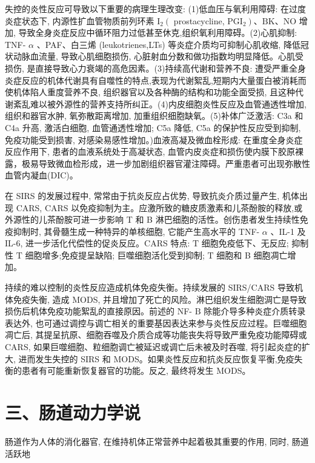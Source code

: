 \documentclass[10pt]{article}
\begin{document}
失控的炎性反应可导致以下重要的病理生理改变: (1)低血压与氧利用障碍: 在过度炎症状态下, 内源性扩血管物质前列环素 $\mathrm{I}_{2}\left(\right.$ prostacycline, $\left.\mathrm{PGI}_{2}\right) 、 \mathrm{BK} 、 \mathrm{NO}$ 增加, 导致全身炎症反应中循环阻力过低甚至休克,组织氧利用障碍。(2)心肌抑制: TNF- $\alpha$ 、PAF、白三烯 (leukotrienes,LTs) 等炎症介质均可抑制心肌收缩, 降低冠状动脉血流量, 导致心肌细胞损伤, 心脏射血分数和做功指数均明显降低。心肌受损伤, 是直接导致心力衰竭的高危因素。(3)持续高代谢和营养不良: 遭受严重全身炎症反应的机体代谢具有自噬性的特点,表现为代谢絮乱,短期内大量蛋白被消耗而使机体陷人重度营养不良, 组织器官以及各种酶的结构和功能全面受损, 且这种代谢紊乱难以被外源性的营养支持所纠正。(4)内皮细胞炎性反应及血管通透性增加, 组织和器官水肿, 氧弥散距离增加, 加重组织细胞缺氧。(5)补体广泛激活: C3a 和 C4a 升高, 激活白细胞, 血管通透性增加; C5a 降低, C5a 的保护性反应受到抑制, 免疫功能受到损害, 对感染易感性增加。)血液高凝及微血栓形成: 在重度全身炎症反应作用下, 患者的血液系统处于高凝状态, 血管内皮炎症和损伤使内膜下胶原裸露，极易导致微血检形成，进一步加剧组织器官灌注障碍。严重患者可出现弥散性血管内凝血(DIC)。

在 SIRS 的发展过程中, 常常由于抗炎反应占优势, 导致抗炎介质过量产生, 机体出现 CARS, CARS 以免疫抑制为主。应激所致的糖皮质激素和儿茶酚胺的释放,或外源性的儿茶酚胺可进一步影响 T 和 B 淋巴细胞的活性。创伤患者发生持续性免疫抑制时, 其骨髓生成一种特异的单核细胞, 它能产生高水平的 TNF- $\alpha$ 、IL-1 及 IL-6, 进一步活化代偿性的促炎反应。CARS 特点: $\mathrm{T}$ 细胞免疫低下、无反应; 抑制性 $\mathrm{T}$ 细胞增多;免疫提呈缺陷; 巨噬细胞活化受到抑制; $\mathrm{T}$ 细胞和 B 细胞凋亡增加。

持续的难以控制的炎性反应造成机体免疫失衡。持续发展的 SIRS/CARS 导致机体免疫失衡, 造成 MODS, 并且增加了死亡的风险。淋巴组织发生细胞淍亡是导致损伤后机体免疫功能絮乱的直接原因。前述的 NF- $\mathrm{B}$ 除能介导多种炎症介质转录表达外, 也可通过调控与调亡相关的重要基因表达来参与炎性反应过程。巨噬细胞凋亡后, 其提呈抗原、细胞吞噬及介质合成等功能丧失将导致严重免疫功能障碍或 CARS, 如果巨噬细胞、粒细胞调亡被延迟或调亡后未被及时吞噬, 将引起炎症的扩大, 进而发生失控的 SIRS 和 MODS。如果炎性反应和抗炎反应恢复平衡,免疫失衡的患者有可能重新恢复器官的功能。反之, 最终将发生 MODS。

\section*{三、肠道动力学说}
肠道作为人体的消化器官, 在维持机体正常营养中起着极其重要的作用, 同时, 肠道活跃地
\end{document}
